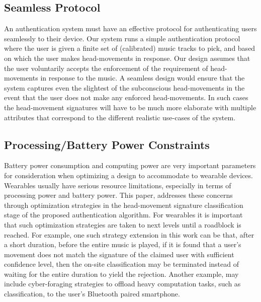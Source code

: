 \subsection{Seamless Protocol}
An authentication system must have an effective protocol for authenticating
users seamlessly to their device. Our system runs a simple authentication
protocol where the user is given a finite set of (calibrated) music
tracks to pick, and based on which the user makes head-movements in response.
Our design assumes that the user voluntarily accepts the enforcement of the
requirement of head-movements in response to the music. A seamless design
would ensure that the system captures even the slightest of the subconscious
head-movements in the event that the user does not make any enforced
head-movements. In such cases the head-movement signatures will have to be
much more elaborate with multiple attributes that correspond to the different
realistic use-cases of the system.

\subsection{Processing/Battery Power Constraints}
Battery power consumption and computing power are very important parameters
for consideration when optimizing a design to accommodate to wearable devices.
Wearables usually have serious resource limitations, especially in terms of
processing power and battery power.
This paper, addresses these concerns through optimization strategies in the
head-movement signature classification stage of the proposed authentication
algorithm. For wearables it is important that such optimization strategies are
taken to next levels until a roadblock is reached.
For example, one such strategy extension in this work can be that, after a
short duration, before the entire music is played, if it is found that a
user's movement does not match the signature of the claimed user
with sufficient confidence level, then the on-site classification may be
terminated  instead of waiting for the entire duration to yield the rejection.
Another example, may include cyber-foraging strategies to offload heavy
computation tasks, such as classification, to the user's Bluetooth paired
smartphone.

